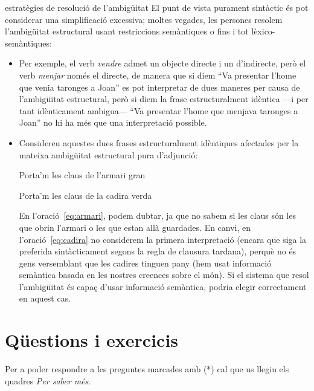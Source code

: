 \begin{persabermes}{estratègies de resolució de l'ambigüitat}
  El punt de vista purament sintàctic és pot considerar una
  simplificació excessiva; moltes vegades, les persones resolem
  l'ambigüitat estructural usant restriccions semàntiques o fins i tot
  lèxico-semàntiques:
  \begin{itemize}
  \item Per exemple, el verb \emph{vendre} admet un objecte directe i
    un d'indirecte, però el verb \emph{menjar} només el directe, de
    manera que si diem ``Va presentar l'home que venia taronges a
    Joan'' es pot interpretar de dues maneres per causa de l'ambigüitat
    estructural, però si diem la frase estructuralment idèntica ---i
    per tant idènticament ambigua--- ``Va presentar l'home que menjava
    taronges a Joan'' no hi ha més que una interpretació possible.
  \item Considereu aquestes dues frases estructuralment idèntiques
    afectades per la mateixa ambigüitat estructural pura d'adjunció:
    \begin{exemple}
      \label{eq:armari}
      Porta'm les claus de l'armari gran
    \end{exemple}
    \begin{exemple}
      \label{eq:cadira}
      Porta'm les claus de la cadira verda
    \end{exemple}
    En l'oració~\ref{eq:armari}, podem dubtar, ja que no sabem si les
    claus són les que obrin l'armari o les que estan allà
    guardades. En canvi, en l'oració~\ref{eq:cadira} no considerem la
    primera interpretació (encara que siga la preferida sintàcticament
    segons la regla de clausura tardana), perquè no és gens
    versemblant que les cadires tinguen pany (hem usat informació
    semàntica basada en les nostres creences sobre el món). Si el
    sistema que resol l'ambigüitat és capaç d'usar informació
    semàntica, podria elegir correctament en aquest cas.
  \end{itemize}
\end{persabermes}

\section{Qüestions i exercicis}
Per a poder respondre a les preguntes marcades amb (*) cal que us
llegiu els quadres \emph{Per saber més}.

